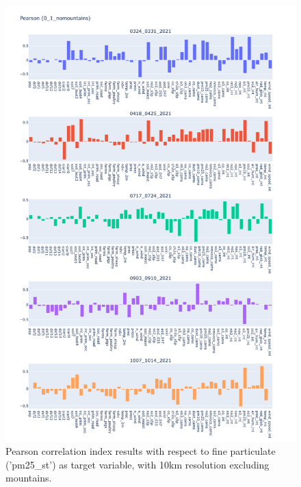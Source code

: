 \begin{figure}[H]
    \centering
    \includegraphics[scale=0.35]{images/tests/0_1_nomountainspm25_st_pearson.png}
    \caption{Pearson correlation index results with respect to fine particulate ('pm25\_st') as target variable, with 10km resolution excluding mountains.}
    
\end{figure}
